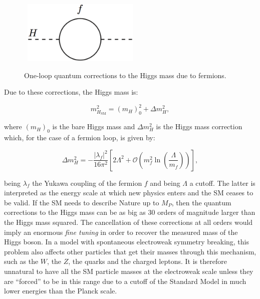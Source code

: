 \begin{figure}[!t]
\begin{center}
\mbox{
\includegraphics[width=0.495\textwidth]{BeyondSM/Figures/HiggsLoopFermion.eps}
}
\end{center}
\caption{One-loop quantum corrections to the Higgs mass due to fermions.}
\label{fig:HiggsLoop}
\end{figure}

Due to these corrections, the Higgs mass is:

\begin{equation}
m_{H_{\text{SM}}}^2 = (m_H)_{0}^{2} + \Delta m_H^2,
\label{eq:HiggsMassTotal}
\end{equation}

\noindent where $(m_H)_0$ is the bare Higgs mass and $\Delta m_H^2$ is the Higgs mass correction which, for the case of a fermion loop, is given by:

\begin{equation}
\Delta m_H^2 = -\frac{|\lambda_f|^2}{16\pi^2}\left[2\Lambda^2 + \mathcal{O}\left(m_f^2\ln{\left(\frac{\Lambda}{m_f}\right)}\right)\right],
\label{eq:HiggsMassCorrectionFermion}
\end{equation}

\noindent being $\lambda_f$ the Yukawa coupling of the fermion $f$ and being $\Lambda$ a cutoff.
The latter is interpreted as the energy scale at which new physics enters and the SM ceases to be valid.
If the SM needs to describe Nature up to $M_P$, then the quantum corrections to the Higgs mass can be as big as 30 orders of magnitude larger than the Higgs mass squared.
The cancellation of these corrections at all orders would imply an enormous \emph{fine tuning} in order to recover the measured mass of the Higgs boson.
In a model with spontaneous electroweak symmetry breaking, this problem also affects other particles that get their masses through this mechanism, such as the $W$, the $Z$, the quarks and the charged leptons.
It is therefore unnatural to have all the SM particle masses at the electroweak scale unless they are ``forced'' to be in this range due to a cutoff of the Standard Model in much lower energies than the Planck scale.

